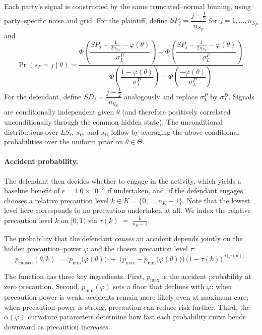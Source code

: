 \documentclass{article}
\begin{document}
Each party’s signal is constructed by the same truncated–normal binning, using party–specific noise and grid. For the plaintiff, define $SP_j=\dfrac{j-\tfrac12}{n_{S_P}}$ for $j=1,\dots,n_{S_P}$ and
\[
\Pr(s_P=j\mid \theta)
=
\frac{
\Phi\!\left(\dfrac{SP_j+\tfrac{1}{2n_{S_P}}-\varphi(\theta)}{\sigma_L^{P}}\right)
-
\Phi\!\left(\dfrac{SP_j-\tfrac{1}{2n_{S_P}}-\varphi(\theta)}{\sigma_L^{P}}\right)
}{
\Phi\!\left(\dfrac{1-\varphi(\theta)}{\sigma_L^{P}}\right)
-
\Phi\!\left(\dfrac{-\varphi(\theta)}{\sigma_L^{P}}\right)
}.
\]
For the defendant, define $SD_j=\dfrac{j-\tfrac12}{n_{S_D}}$ analogously and replace $\sigma_L^{P}$ by $\sigma_L^{D}$. Signals are conditionally independent given $\theta$ (and therefore positively correlated unconditionally through the common hidden state). The unconditional distributions over $LS_i$, $s_P$, and $s_D$ follow by averaging the above conditional probabilities over the uniform prior on $\theta\in\Theta$.

\paragraph{Accident probability.}

The defendant then decides whether to engage in the activity, which yields a baseline benefit of $\epsilon = 1.0 \times 10^{-3}$ if undertaken, and, if the defendant engages, chooses a relative precaution level $k \in K = \{0,\dots,n_K-1\}$. Note that the lowest level here corresponds to no precaution undertaken at all. We index the relative precaution level $k$ on $[0,1)$ via $\tau(k) \;=\; \frac{k}{n_K + 1}$.

The probability that the defendant \emph{causes} an accident depends jointly on the hidden precaution–power $\varphi$ and the chosen precaution level $\tau$:
\begin{equation}
p_{\mathrm{caused}}(\theta,k)
\;=\;
p_{\min}\!\bigl(\varphi(\theta)\bigr)
\;+\;
\bigl(p_{\max}-p_{\min}\!\bigl(\varphi(\theta)\bigr)\bigr)\,
\bigl(1-\tau(k)\bigr)^{\,\alpha\!\bigl(\varphi(\theta)\bigr)}.
\label{eq:pcaused}
\end{equation}

The function has three key ingredients. First, $p_{\max}$ is the accident probability at zero precaution. Second, $p_{\min}(\varphi)$ sets a floor that declines with $\varphi$: when precaution power is weak, accidents remain more likely even at maximum care; when precaution power is strong, precaution can reduce risk further. Third, the  $\alpha(\varphi)$ curvature parameters determine how fast each probability curve bends downward as precaution increases.
\end{document}
